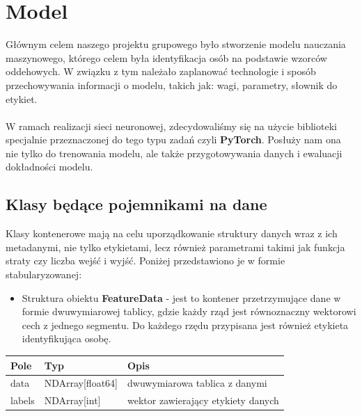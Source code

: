 \section{Model} %
Głównym celem naszego projektu grupowego było stworzenie modelu nauczania maszynowego,
którego celem była identyfikacja osób na podstawie wzorców oddehowych. W związku z tym należało
zaplanować technologie i sposób przechowywania informacji o modelu, takich jak: wagi, parametry,
słownik do etykiet.\\
\\
W ramach realizacji sieci neuronowej, zdecydowaliśmy się na użycie biblioteki specjalnie
przeznaczonej do tego typu zadań czyli \textbf{PyTorch}. Posłuży nam ona nie tylko do trenowania
modelu, ale także przygotowywania danych i ewaluacji dokładności modelu.

\subsection{Klasy będące pojemnikami na dane}
Klasy kontenerowe mają na celu uporządkowanie struktury danych wraz z ich metadanymi,
nie tylko etykietami, lecz również parametrami takimi jak funkcja straty czy liczba wejść i wyjść.
Poniżej przedstawiono je w formie stabularyzowanej:

\begin{itemize}
    \item Struktura obiektu \textbf{FeatureData} - jest to kontener przetrzymujące dane w formie
    dwuwymiarowej tablicy, gdzie każdy rząd jest równoznaczny wektorowi cech z jednego segmentu. Do
    każdego rzędu przypisana jest również etykieta identyfikująca osobę.
\end{itemize}
\begin{center}
	\begin{tabular}{|l|l|l|}
		\hline
		Pole & Typ & Opis \\
		\hline
		data & NDArray[float64] & dwuwymiarowa tablica z danymi \\
		\hline
        labels & NDArray[int] & wektor zawierający etykiety danych \\
		\hline
	\end{tabular}
\end{center}

